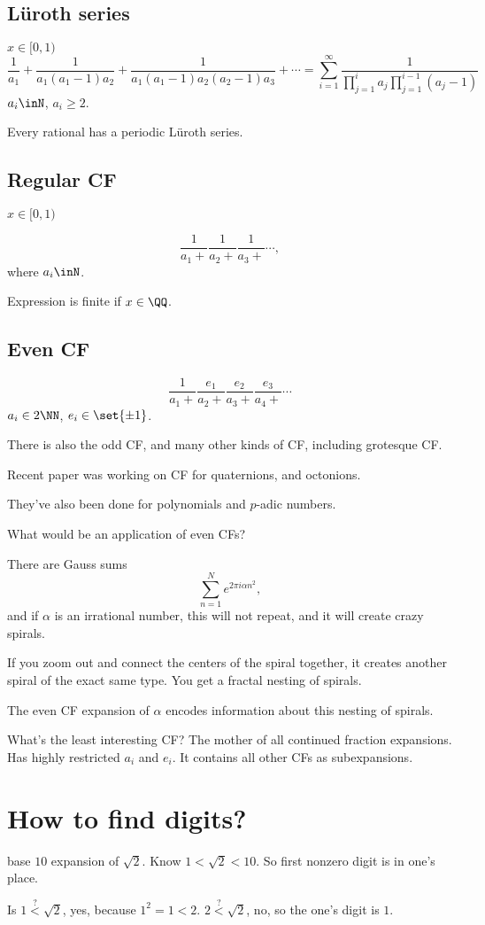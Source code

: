 \documentclass{article}
\newcommand\cft[1]{\frac{1}{#1+}}
\newcommand\hoint{[0,1)}
\begin{document}
\subsection{L\"uroth series}

$x\in\hoint$
\[ \frac{1}{a_1} + \frac{1}{a_1(a_1-1)a_2} + 
\frac{1}{a_1(a_1-1)a_2(a_2-1)a_3} + \cdots
=\sum_{i=1}^\infty \frac{1}{\prod_{j=1}^i a_j \prod_{j=1}^{i-1}(a_j-1)} \]
$a_i\inN$, $a_i \ge 2$.

Every rational has a periodic L\"uroth series.

\subsection{Regular CF}

$x\in \hoint$

\[ \cft{a_1}\cft{a_2}\cft{a_3} \cdots, \]
where $a_i \inN$.

Expression is finite if $x\in\QQ$.

\subsection{Even CF}

\newcommand\cftt[2]{\frac{#1}{#2+}}

\[ \cft{a_1}\cftt{e_1}{a_2}\cftt{e_2}{a_3}\cftt{e_3}{a_4}\cdots\]
$a_i\in 2\NN$, $e_i\in \set{\pm 1}$.

There is also the odd CF, and many other kinds of CF, including
grotesque CF.

Recent paper was working on CF for quaternions, and octonions.

They've also been done for polynomials and $p$-adic numbers.

What would be an application of even CFs? 

There are Gauss sums
\[ \sum_{n=1}^N e^{2\pi i \alpha n^2}, \]
and if $\alpha$ is an irrational number, this will not repeat,
and it will create crazy spirals. 

If you zoom out and connect the centers of the spiral together,
it creates another spiral of the exact same type. You get a 
fractal nesting of spirals.

The even CF expansion of $\alpha$ encodes information about
this nesting of spirals.


What's the least interesting CF? 
The mother of all continued fraction expansions. Has highly
restricted $a_i$ and $e_i$. It contains all other
CFs as subexpansions.

\section{How to find digits?}

base $10$ expansion of $\sqrt{2}$. Know $1< \sqrt{2} < 10$.
So first nonzero digit is in one's place.

Is $1\overset{?}{<} \sqrt{2}$, yes, because $1^2=1<2$.
$2\overset{?}{<} \sqrt{2}$, no, so the one's digit is $1$.
\end{document}
